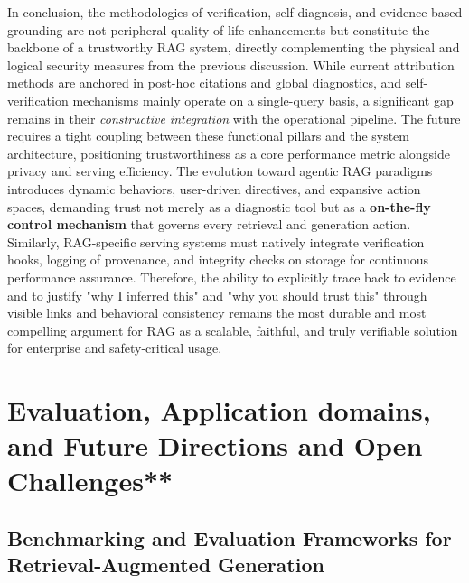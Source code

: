 \documentclass[11pt,a4paper]{article}
\begin{document}
In conclusion, the methodologies of verification, self-diagnosis, and evidence-based grounding are not peripheral quality-of-life enhancements but constitute the backbone of a trustworthy RAG system, directly complementing the physical and logical security measures from the previous discussion. While current attribution methods are anchored in post-hoc citations and global diagnostics, and self-verification mechanisms mainly operate on a single-query basis, a significant gap remains in their \emph{constructive integration} with the operational pipeline. The future requires a tight coupling between these functional pillars and the system architecture, positioning trustworthiness as a core performance metric alongside privacy and serving efficiency. The evolution toward agentic RAG paradigms \cite{arxiv:2501.09136v4} introduces dynamic behaviors, user-driven directives, and expansive action spaces, demanding trust not merely as a diagnostic tool but as a \textbf{on-the-fly control mechanism} that governs every retrieval and generation action. Similarly, RAG-specific serving systems \cite{arxiv:2503.14649v2,arxiv:2506.03401v1,arxiv:2507.09138v1} must natively integrate verification hooks, logging of provenance, and integrity checks on storage for continuous performance assurance. Therefore, the ability to explicitly trace back to evidence and to justify "why I inferred this" and "why you should trust this" through visible links and behavioral consistency remains the most durable and most compelling argument for RAG as a scalable, faithful, and truly verifiable solution for enterprise and safety-critical usage.


\section{Evaluation, Application domains, and Future Directions and Open Challenges**}



\subsection{Benchmarking and Evaluation Frameworks for Retrieval-Augmented Generation}
\end{document}
